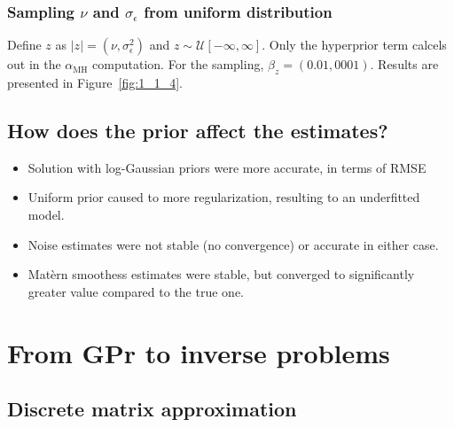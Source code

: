 \documentclass[times, a4paper, 12pt, onecolumn, oneside]{article}
\begin{document}
\subsubsection{Sampling $\nu$ and $\sigma_\epsilon$ from uniform distribution}

Define $z$ as $|z| = (\nu, \sigma_\epsilon^2)$ and $z \sim \mathcal{U}\left[-\infty, \infty\right]$. Only the hyperprior term calcels out in the $\alpha_\text{MH}$ computation.
For the sampling, $\beta_z = (0.01, 0001)$.
Results are presented in Figure~\ref{fig:1_1_4}.

\subsection{How does the prior affect the estimates?}

\begin{itemize}
    \item Solution with log-Gaussian priors were more accurate, in terms of RMSE
    \item Uniform prior caused to more regularization, resulting to an underfitted model.
    \item Noise estimates were not stable (no convergence) or accurate in either case.
    \item Matèrn smoothess estimates were stable, but converged to significantly greater value compared to the true one.
\end{itemize}

\section{From GPr to inverse problems}

\subsection{Discrete matrix approximation}
\end{document}
